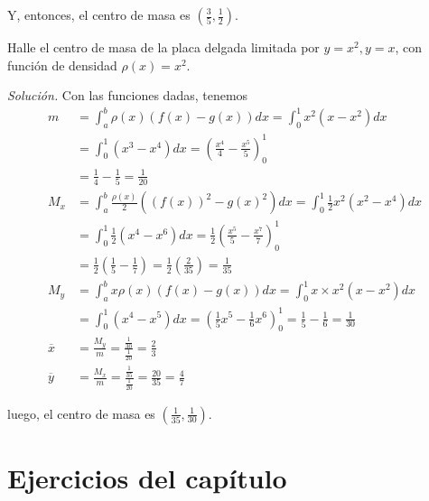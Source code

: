 Y, entonces, el centro de masa es $\left( \frac{3}{5},\frac{1}{2}\right)$.

\begin{ejemplo}
Halle el centro de masa de la placa delgada limitada por $y=x^{2},y=x$, con función de densidad $\rho \left( x\right) =x^{2}$.
\end{ejemplo}

\enlargethispage*{\baselineskip}

\emph{Solución.} Con las funciones dadas, tenemos
\begin{align*}
m&=\int_{a}^{b}\rho \left( x\right) \left( f\left( x\right) -g\left(
x\right) \right) dx=\int_{0}^{1}x^{2}\left( x-x^{2}\right) dx\\
&=\int_{0}^{1}\left( x^{3}-x^{4}\right) dx=\left( \frac{x^{4}}{4}-\frac{x^{5}%
}{5}\right) _{0}^{1}\\
&=\frac{1}{4}-\frac{1}{5}
=\frac{1}{20}\\[0.5em]
M_{x}&=\int_{a}^{b}\frac{\rho \left( x\right) }{2}\left( \left( f\left(
x\right) \right) ^{2}-g\left( x\right) ^{2}\right) dx=\int_{0}^{1}\frac{1}{2}
x^{2}\left( x^{2}-x^{4}\right) dx\\
&=\int_{0}^{1}\frac{1}{2}\left( x^{4}-x^{6}\right) dx=\frac{1}{2}
\left(\frac{x^{5}}{5}-\frac{x^{7}}{7}\right) _{0}^{1}\\
&=\frac{1}{2}\left( \frac{1}{5}-\frac{1}{7}\right) =\frac{1}{2}\left( \frac{2}{35}\right)= \frac{1}{35}\\[0.5em]
M_{y}&=\int_{a}^{b}x\rho \left( x\right) \left( f\left( x\right) -g\left(
x\right) \right) dx=\int_{0}^{1}x\times x^{2}\left( x-x^{2}\right)
dx\\
&=\int_{0}^{1}\left( x^{4}-x^{5}\right) dx=\left( \frac{1}{5}x^{5}-\frac{1}{
6}x^{6}\right) _{0}^{1}=\frac{1}{5}-\frac{1}{6}=\frac{1}{30}\\[0.5em]
\overline{x}&=\frac{M_{y}}{m}=\frac{\frac{1}{30}}{\frac{1}{20}}=\frac{2}{3}\\
\overline{y}&=\frac{M_{x}}{m}=\frac{\frac{1}{35}}{\frac{1}{20}}=\frac{20}{35}%
=\frac{4}{7}
\end{align*}

luego, el centro de masa es $\left( \frac{1}{35},\frac{1}{30}\right) $.

\section{Ejercicios del capítulo~\thechapter}

\group

